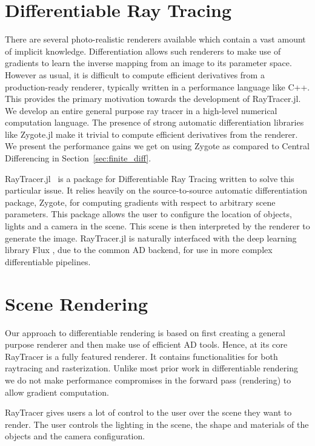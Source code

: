 \documentclass{juliacon}
\begin{document}
\section{Differentiable Ray Tracing}

There are several photo-realistic renderers available which contain a vast amount of implicit knowledge. Differentiation allows such renderers to make use of gradients to learn the inverse mapping from an image to its parameter space. However as usual, it is difficult to compute efficient derivatives from a production-ready renderer, typically written in a performance language like C++. This provides the primary motivation towards the development of RayTracer.jl. We develop an entire general purpose ray tracer in a high-level numerical computation language. The presence of strong automatic differentiation libraries like Zygote.jl make it trivial to compute efficient derivatives from the renderer. We present the performance gains we get on using Zygote as compared to Central Differencing in Section~\ref{sec:finite_diff}.

RayTracer.jl~\cite{RayTracer.jl} is a package for Differentiable Ray Tracing written to solve this particular issue. It relies heavily on the source-to-source automatic differentiation package, Zygote, for computing gradients with respect to arbitrary scene parameters. This package allows the user to configure the location of objects, lights and a camera in the scene. This scene is then interpreted by the renderer to generate the image. RayTracer.jl is naturally interfaced with the deep learning library Flux \cite{Flux.jl-2018}, due to the common AD backend, for use in more complex differentiable pipelines.

\section{Scene Rendering}

Our approach to differentiable rendering is based on first creating a general purpose renderer and then make use of efficient AD tools. Hence, at its core RayTracer is a fully featured renderer. It contains functionalities for both raytracing and rasterization. Unlike most prior work in differentiable rendering we do not make performance compromises in the forward pass (rendering) to allow gradient computation.

RayTracer gives users a lot of control to the user over the scene they want to render. The user controls the lighting in the scene, the shape and materials of the objects and the camera configuration.
\end{document}
